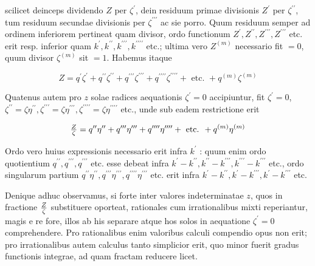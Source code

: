 \documentclass[twoside,12pt, showframe]{memoir}
\let\oldfrac\frac
\def\frac#1#2{\mathchoice{\tfrac{#1}{#2}}{\oldfrac{#1}{#2}}{\genfrac{}{}{}{2}{#1}{#2\mathstrut}}{\genfrac{}{}{}{3}{#1}{#2\mathstrut}}}
\begin{document}
scilicet deinceps dividendo \(Z\) per \(\zeta^{\prime}\), dein residuum primae divisionis \(Z^{\prime}\) per \(\zeta^{\prime \prime}\), tum residuum secundae divisionis per \(\zeta^{\prime \prime \prime}\) ac sie porro. Quum residuum semper ad ordinem inferiorem pertineat quam divisor, ordo functionum \(Z^{\prime}, Z^{\prime \prime}, Z^{\prime \prime \prime}, Z^{\prime \prime \prime}\) etc. erit resp. inferior quam \(k^{\prime}, k^{\prime \prime}, k^{\prime \prime \prime}, k^{\prime \prime \prime \prime}\) etc.; ultima vero \(Z^{(m)}\) necessario fit \(=0\), quum divisor \(\zeta^{(m)}\) sit \(=1\). Habemus itaque

\[
Z=q^{\prime} \zeta^{\prime}+q^{\prime \prime} \zeta^{\prime \prime}+q^{\prime \prime \prime} \zeta^{\prime \prime \prime}+q^{\prime \prime \prime \prime} \zeta^{\prime \prime \prime \prime}+\text { etc. }+q^{(m)} \zeta^{(m)}
\]

Quatenus autem pro \(z\) solae radices aequationis \(\zeta^{\prime}=0\) accipiuntur, fit \(\zeta^{\prime}=0\), \(\zeta^{\prime \prime}=\zeta \eta^{\prime \prime}, \zeta^{\prime \prime \prime}=\zeta \eta^{\prime \prime \prime}, \zeta^{\prime \prime \prime \prime}=\zeta \eta^{\prime \prime \prime \prime}\) etc., unde sub eadem restrictione erit

\[
\frac{Z}{\zeta}=q^{\prime \prime} \eta^{\prime \prime}+q^{\prime \prime \prime} \eta^{\prime \prime \prime}+q^{\prime \prime \prime \prime} \eta^{\prime \prime \prime \prime}+\text { etc. }+q^{(m)} \eta^{(m)}
\]

Ordo vero huius expressionis necessario erit infra \(k^{\prime}\) : quum enim ordo quotientium \(q^{\prime \prime}, q^{\prime \prime \prime}, q^{\prime \prime \prime}\) etc. esse debeat infra \(k^{\prime}-k^{\prime \prime}, k^{\prime \prime}-k^{\prime \prime \prime}, k^{\prime \prime \prime}-k^{\prime \prime \prime}\) etc., ordo singularum partium \(q^{\prime \prime} \eta^{\prime \prime}, q^{\prime \prime \prime} \eta^{\prime \prime \prime}, q^{\prime \prime \prime \prime} \eta^{\prime \prime \prime}\) etc. erit infra \(k^{\prime}-k^{\prime \prime}, k^{\prime}-k^{\prime \prime \prime}, k^{\prime}-k^{\prime \prime \prime}\) etc.

Denique adhuc observamus, si forte inter valores indeterminatae \(z\), quos in fractione \(\frac{Z}{\zeta}\) substituere oporteat, rationales cum irrationalibus mixti reperiantur, magis e re fore, illos ab his separare atque hos solos in aequatione \(\zeta^{\prime}=0\) comprehendere. Pro rationalibus enim valoribus calculi compendio opus non erit; pro irrationalibus autem calculus tanto simplicior erit, quo minor fuerit gradus functionis integrae, ad quam fractam reducere licet.
\end{document}
